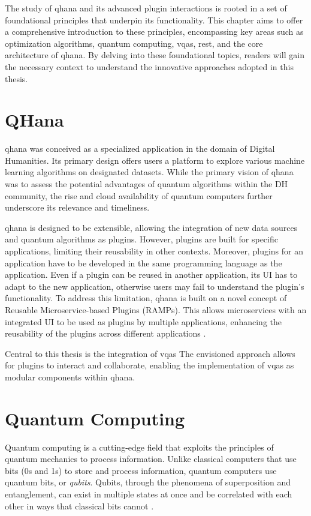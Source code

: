 \documentclass[
  a4paper,  %
  twoside,  %
  bibliography=totoc,
  headsepline,
  cleardoublepage=empty,
  parskip=half,
  draft=false
]{scrbook}
\begin{document}
The study of \gls{qhana} and its advanced plugin interactions is rooted in a set of foundational principles that underpin its functionality.
This chapter aims to offer a comprehensive introduction to these principles, encompassing key areas such as optimization algorithms, quantum computing, \glspl{vqa}, \gls{rest}, and the core architecture of \gls{qhana}.
By delving into these foundational topics, readers will gain the necessary context to understand the innovative approaches adopted in this thesis.

\section{QHana}
\label{sec:qhana}

\gls{qhana} was conceived as a specialized application in the domain of Digital Humanities.
Its primary design offers users a platform to explore various machine learning algorithms on designated datasets.
While the primary vision of \gls{qhana} was to assess the potential advantages of quantum algorithms within the DH community, the rise and cloud availability of quantum computers further underscore its relevance and timeliness.

\gls{qhana} is designed to be extensible, allowing the integration of new data sources and quantum algorithms as plugins.
However, plugins are built for specific applications, limiting their reusability in other contexts.
Moreover, plugins for an application have to be developed in the same programming language as the application.
Even if a plugin can be reused in another application, its UI has to adapt to the new application, otherwise users may fail to understand the plugin's functionality.
To address this limitation, \gls{qhana} is built on a novel concept of Reusable Microservice-based Plugins (RAMPs).
This allows microservices with an integrated UI to be used as plugins by multiple applications, enhancing the reusability of the plugins across different applications \cite{Buehler2022}.

Central to this thesis is the integration of \glspl{vqa}
The envisioned approach allows for plugins to interact and collaborate, enabling the implementation of \glspl{vqa} as modular components within \gls{qhana}.

\section{Quantum Computing}
\label{sec:quantumComputing}
Quantum computing is a cutting-edge field that exploits the principles of quantum mechanics to process information.
Unlike classical computers that use bits (0s and 1s) to store and process information, quantum computers use quantum bits, or \emph{qubits}.
Qubits, through the phenomena of superposition and entanglement, can exist in multiple states at once and be correlated with each other in ways that classical bits cannot \cite{Nielsen2010}.
\end{document}
